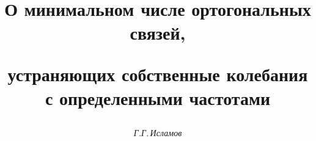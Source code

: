 




%





\newcommand{\tr}{\operatorname{tr}}




\newcommand{\Nul}{\operatorname{nul}}


\newcommand{\rang}{\operatorname{rang}}


\newcommand{\tts}[1]{}







\setcounter{page}{78}















\author{\it Г.Г.\,Исламов}




\title{О минимальном числе ортогональных связей,


устраняющих собственные колебания\\ с определенными частотами}





\date{}




\pagestyle{plain} %








